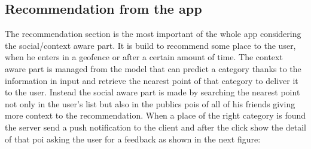 \documentclass[../../main]{subfiles}
\begin{document}
\newpage
\subsection{Recommendation from the app}
\label{ss:final-recommendation}
The recommendation section is the most important of the whole app considering the social/context aware part.
It is build to recommend some place to the user, when he enters in a geofence or after a certain amount of time.
The context aware part is managed from the model that can predict a category thanks to the information in input and retrieve the nearest point of that category 
to deliver it to the user. Instead the social aware part is made by searching the nearest point not only in the user's list but also in the publics pois of all
of his friends giving more context to the recommendation.
When a place of the right category is found the server send a push notification to the client and after the click show the detail of that poi 
asking the user for a feedback as shown in the next figure:
\end{document}
